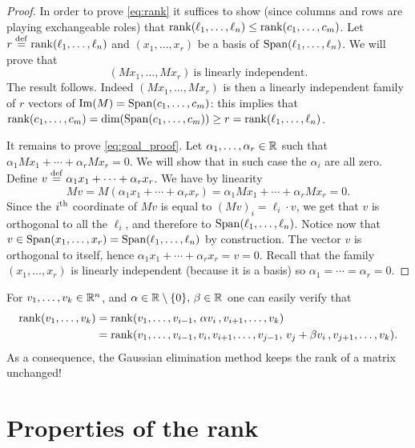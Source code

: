 \documentclass[11pt,nocut]{article}
\begin{document}
\begin{proof}
	In order to prove \eqref{eq:rank} it suffices to show (since columns and rows are playing exchangeable roles) that ${{\rm rank}}(\ell_1, \dots, \ell_n) \leq {{\rm rank}}(c_1, \dots, c_m)$.
	Let $r \overset{\rm def}{=} {{\rm rank}}(\ell_1, \dots, \ell_n)$ and $(x_1, \dots, x_r)$ be a basis of ${{\rm Span}}(\ell_1, \dots, \ell_n)$. We will prove that
	\begin{equation}\label{eq:goal_proof}
	(M x_1, \dots, M x_r) \ \text{is linearly independent}.
	\end{equation}
	The result follows. Indeed $(M x_1, \dots, M x_r)$ is then a linearly independent family of $r$ vectors of ${{\rm Im}}(M) = {{\rm Span}}(c_1, \dots, c_m)$: this implies that ${{\rm rank}}(c_1, \dots, c_m) = {{\rm dim}}({{\rm Span}}(c_1, \dots, c_m)) \geq r = {{\rm rank}}(\ell_1, \dots, \ell_n)$.

	It remains to prove \eqref{eq:goal_proof}. Let $\alpha_1, \dots, \alpha_r \in \mathbb{R}$ such that $\alpha_1 M x_1 + \cdots + \alpha_r M x_r = 0$. We will show that in such case the $\alpha_i$ are all zero. Define $v \overset{\rm def}{=} \alpha_1 x_1 + \cdots + \alpha_r x_r$. We have by linearity
	$$
	M v = M (\alpha_1 x_1 + \cdots + \alpha_r x_r) = \alpha_1 M x_1 + \cdots + \alpha_r M x_r = 0.
	$$
	Since the $i^{\rm th}$ coordinate of $Mv$ is equal to $(Mv)_i = \ell_i \cdot v$, we get that $v$ is orthogonal to all the $\ell_i$, and therefore to ${{\rm Span}}(\ell_1, \dots, \ell_n)$. Notice now that $v \in {{\rm Span}}(x_1, \dots, x_r) = {{\rm Span}}(\ell_1, \dots, \ell_n)$ by construction. The vector $v$ is orthogonal to itself, hence $\alpha_1 x_1 + \cdots + \alpha_r x_r = v= 0$. Recall that the family $(x_1, \dots, x_r)$ is linearly independent (because it is a basis) so $\alpha_1 = \cdots = \alpha_r = 0$.
\end{proof}

\begin{remark}
	For $v_1, \dots, v_k \in \mathbb{R}^n$, and $\alpha \in \mathbb{R} \setminus \{0\}, \, \beta \in \mathbb{R}$ one can easily verify that
	\begin{align*}
	{{\rm rank}}(v_1, \dots, v_k)
	&=
	{{\rm rank}}(v_1, \dots, v_{i-1}, \, \alpha v_i \, , v_{i+1}, \dots, v_k)\\
	&=
	{{\rm rank}}(v_1, \dots, v_{i-1}, v_i, v_{i+1}, \dots, v_{j-1}, \, v_j + \beta v_i \, , v_{j+1}, \dots, v_k).
	\end{align*}
	As a consequence, the Gaussian elimination method keeps the rank of a matrix unchanged!
\end{remark}

\section{Properties of the rank}
\end{document}
